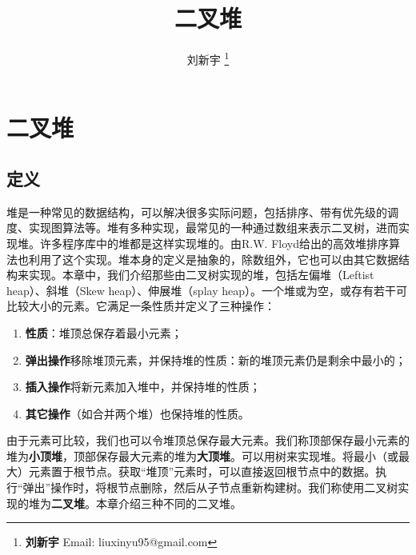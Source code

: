 \documentclass[b5paper]{ctexart}
\begin{document}
\title{二叉堆}

\author{刘新宇
\thanks{{\bfseries 刘新宇 } \newline
  Email: liuxinyu95@gmail.com \newline}
  }

\maketitle
\fi


\ifx\wholebook\relax
\chapter{二叉堆}
\fi

\section{定义}
\label{introduction} 

堆是一种常见的数据结构，可以解决很多实际问题，包括排序、带有优先级的调度、实现图算法等\cite{wiki-heap}。堆有多种实现，最常见的一种通过数组来表示二叉树\cite{CLRS}，进而实现堆。许多程序库中的堆都是这样实现堆的。由R.W. Floyd给出的高效堆排序算法也利用了这个实现\cite{wiki-heapsort}\cite{rosetta-heapsort}。堆本身的定义是抽象的，除数组外，它也可以由其它数据结构来实现。本章中，我们介绍那些由二叉树实现的堆，包括左偏堆（Leftist heap）、斜堆（Skew heap）、伸展堆（splay heap）\cite{okasaki-book}。一个堆或为空，或存有若干可比较大小的元素。它满足一条性质并定义了三种操作：

\begin{enumerate}
\item \textbf{性质}：堆顶总保存着最小元素；
\item \textbf{弹出操作}移除堆顶元素，并保持堆的性质：新的堆顶元素仍是剩余中最小的；
\item \textbf{插入操作}将新元素加入堆中，并保持堆的性质；
\item \textbf{其它操作}（如合并两个堆）也保持堆的性质。
\end{enumerate}

由于元素可比较，我们也可以令堆顶总保存最大元素。我们称顶部保存最小元素的堆为\textbf{小顶堆}，顶部保存最大元素的堆为\textbf{大顶堆}。可以用树来实现堆。将最小（或最大）元素置于根节点。获取“堆顶”元素时，可以直接返回根节点中的数据。执行“弹出”操作时，将根节点删除，然后从子节点重新构建树。我们称使用二叉树实现的堆为\textbf{二叉堆}。本章介绍三种不同的二叉堆。
\end{document}
